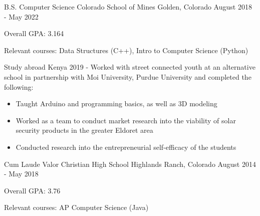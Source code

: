 

\begin{cventries}

  \cventry
    {B.S. Computer Science}
    {Colorado School of Mines} %
    {Golden, Colorado} %
    {August 2018 - May 2022} %
    {
      \begin{cvitems} %
        \item {Overall GPA: 3.164}
        \item {Relevant courses: Data Structures (C++), Intro to Computer Science
    (Python)}
   \item {Study abroad Kenya 2019 - Worked with street connected youth
    at an alternative school in partnership with Moi University,
    Purdue University and completed the following:}
   \begin{itemize}
        \item {Taught Arduino and programming basics, as well as 3D modeling}
        \item {Worked as a team to conduct market research into the
    viability of solar security products in the greater Eldoret area}
    \item {Conducted research into the entrepreneurial self-efficacy
    of the students}
   \end{itemize}
      \end{cvitems}
    }
    
  \cventry
    {Cum Laude}
    {Valor Christian High School} %
    {Highlands Ranch, Colorado} %
    {August 2014 - May 2018} %
    {
      \begin{cvitems} %
        \item {Overall GPA: 3.76}
        \item {Relevant courses: AP Computer Science (Java) }
      \end{cvitems}
    }

\end{cventries}


